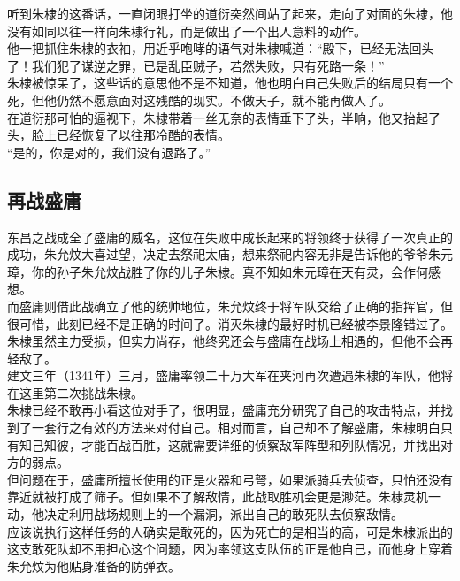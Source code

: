 \begin{multicols}{\theparacolNo}
听到朱棣的这番话，一直闭眼打坐的道衍突然间站了起来，走向了对面的朱棣，他没有如同以往一样向朱棣行礼，而是做出了一个出人意料的动作。\\

他一把抓住朱棣的衣袖，用近乎咆哮的语气对朱棣喊道：“殿下，已经无法回头了！我们犯了谋逆之罪，已是乱臣贼子，若然失败，只有死路一条！”\\

朱棣被惊呆了，这些话的意思他不是不知道，他也明白自己失败后的结局只有一个死，但他仍然不愿意面对这残酷的现实。不做天子，就不能再做人了。\\

在道衍那可怕的逼视下，朱棣带着一丝无奈的表情垂下了头，半晌，他又抬起了头，脸上已经恢复了以往那冷酷的表情。\\

“是的，你是对的，我们没有退路了。”\\

\subsection{再战盛庸}
东昌之战成全了盛庸的威名，这位在失败中成长起来的将领终于获得了一次真正的成功，朱允炆大喜过望，决定去祭祀太庙，想来祭祀内容无非是告诉他的爷爷朱元璋，你的孙子朱允炆战胜了你的儿子朱棣。真不知如朱元璋在天有灵，会作何感想。\\

而盛庸则借此战确立了他的统帅地位，朱允炆终于将军队交给了正确的指挥官，但很可惜，此刻已经不是正确的时间了。消灭朱棣的最好时机已经被李景隆错过了。朱棣虽然主力受损，但实力尚存，他终究还会与盛庸在战场上相遇的，但他不会再轻敌了。\\

建文三年（1341年）三月，盛庸率领二十万大军在夹河再次遭遇朱棣的军队，他将在这里第二次挑战朱棣。\\

朱棣已经不敢再小看这位对手了，很明显，盛庸充分研究了自己的攻击特点，并找到了一套行之有效的方法来对付自己。相对而言，自己却不了解盛庸，朱棣明白只有知己知彼，才能百战百胜，这就需要详细的侦察敌军阵型和列队情况，并找出对方的弱点。\\

但问题在于，盛庸所擅长使用的正是火器和弓弩，如果派骑兵去侦查，只怕还没有靠近就被打成了筛子。但如果不了解敌情，此战取胜机会更是渺茫。朱棣灵机一动，他决定利用战场规则上的一个漏洞，派出自己的敢死队去侦察敌情。\\

应该说执行这样任务的人确实是敢死的，因为死亡的是相当的高，可是朱棣派出的这支敢死队却不用担心这个问题，因为率领这支队伍的正是他自己，而他身上穿着朱允炆为他贴身准备的防弹衣。\\


\end{multicols}
